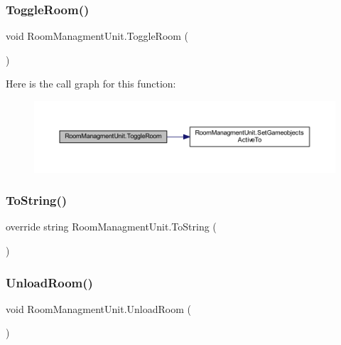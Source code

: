 \subsubsection{\texorpdfstring{Toggle\+Room()}{ToggleRoom()}}
{\footnotesize\ttfamily void Room\+Managment\+Unit.\+Toggle\+Room (\begin{DoxyParamCaption}{ }\end{DoxyParamCaption})}

Here is the call graph for this function\+:
\nopagebreak
\begin{figure}[H]
\begin{center}
\leavevmode
\includegraphics[width=350pt]{class_room_managment_unit_a6043074719f8d67150cbfcff4c7a4cec_cgraph}
\end{center}
\end{figure}
\mbox{\label{class_room_managment_unit_af1299b6fbb2496cc4cb0e14a95cc2b9c}} 
\subsubsection{\texorpdfstring{To\+String()}{ToString()}}
{\footnotesize\ttfamily override string Room\+Managment\+Unit.\+To\+String (\begin{DoxyParamCaption}{ }\end{DoxyParamCaption})}

\mbox{\label{class_room_managment_unit_a45c039de8a79db7ada5831e0abeda972}} 
\subsubsection{\texorpdfstring{Unload\+Room()}{UnloadRoom()}}
{\footnotesize\ttfamily void Room\+Managment\+Unit.\+Unload\+Room (\begin{DoxyParamCaption}{ }\end{DoxyParamCaption})}

